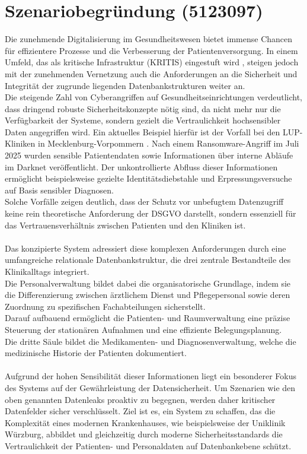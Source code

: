 \section{Szenariobegründung (5123097)}
Die zunehmende Digitalisierung im Gesundheitswesen bietet immense Chancen für effizientere Prozesse und die Verbesserung der Patientenversorgung.
In einem Umfeld, das als kritische Infrastruktur (KRITIS) eingestuft wird \cite{BSI_KRITIS}, steigen jedoch mit der zunehmenden Vernetzung auch die Anforderungen an die Sicherheit und Integrität der zugrunde liegenden Datenbankstrukturen weiter an. \\
Die steigende Zahl von Cyberangriffen auf Gesundheitseinrichtungen verdeutlicht, dass dringend robuste Sicherheitskonzepte nötig sind, da nicht mehr nur die Verfügbarkeit der Systeme, sondern gezielt die Vertraulichkeit hochsensibler Daten angegriffen wird. Ein aktuelles Beispiel hierfür ist der Vorfall bei den LUP-Kliniken in Mecklenburg-Vorpommern \cite{LUP_Leak}. Nach einem Ransomware-Angriff im Juli 2025 wurden sensible Patientendaten sowie Informationen über interne Abläufe im Darknet veröffentlicht. Der unkontrollierte Abfluss dieser Informationen ermöglicht beispielsweise gezielte Identitätsdiebstahle und Erpressungsversuche auf Basis sensibler Diagnosen.\\
Solche Vorfälle zeigen deutlich, dass der Schutz vor unbefugtem Datenzugriff keine rein theoretische Anforderung der DSGVO darstellt, sondern essenziell für das Vertrauensverhältnis zwischen Patienten und den Kliniken ist.\\\\
Das konzipierte System adressiert diese komplexen Anforderungen durch eine umfangreiche relationale Datenbankstruktur, die drei zentrale Bestandteile des Klinikalltags integriert. \\
Die Personalverwaltung bildet dabei die organisatorische Grundlage, indem sie die Differenzierung zwischen ärztlichem Dienst und Pflegepersonal sowie deren Zuordnung zu spezifischen Fachabteilungen sicherstellt.\\
Darauf aufbauend ermöglicht die Patienten- und Raumverwaltung eine präzise Steuerung der stationären Aufnahmen und eine effiziente Belegungsplanung.\\
Die dritte Säule bildet die Medikamenten- und Diagnosenverwaltung, welche die medizinische Historie der Patienten dokumentiert.\\\\
Aufgrund der hohen Sensibilität dieser Informationen liegt ein besonderer Fokus des Systems auf der Gewährleistung der Datensicherheit. Um Szenarien wie den oben genannten Datenleaks proaktiv zu begegnen, werden daher kritischer Datenfelder sicher verschlüsselt. Ziel ist es, ein System zu schaffen, das die Komplexität eines modernen Krankenhauses, wie beispielsweise der Uniklinik Würzburg, abbildet und gleichzeitig durch moderne Sicherheitsstandards die Vertraulichkeit der Patienten- und Personaldaten auf Datenbankebene schützt.